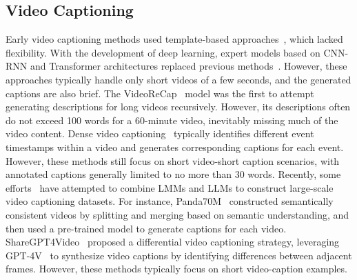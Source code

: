\subsection{Video Captioning}
Early video captioning methods used template-based approaches~\cite{kojima2002natural,guadarrama2013youtube2text,krishnamoorthy2013generating}, which lacked flexibility. 
With the development of deep learning, expert models based on CNN-RNN and Transformer architectures replaced previous methods~\cite{gao2020fused,hu2019hierarchical}. However, these approaches typically handle only short videos of a few seconds, and the generated captions are also brief. 
The VideoReCap~\cite{islam2024video} model was the first to attempt generating descriptions for long videos recursively. 
However, its descriptions often do not exceed 100 words for a 60-minute video, inevitably missing much of the video content. 
Dense video captioning~\cite{YangNSMPLSS23,KimKMC024,WangZLZC021} typically identifies different event timestamps within a video and generates corresponding captions for each event. 
However, these methods still focus on short video-short caption scenarios, with annotated captions generally limited to no more than 30 words. 
Recently, some efforts~\cite{chen2024panda,chen2024sharegpt4video} have attempted to combine LMMs and LLMs to construct large-scale video captioning datasets. 
For instance, Panda70M~\cite{chen2024panda} constructed semantically consistent videos by splitting and merging based on semantic understanding, and then used a pre-trained model to generate captions for each video. 
ShareGPT4Video~\cite{chen2024sharegpt4video} proposed a differential video captioning strategy, leveraging GPT-4V~\cite{achiam2023gpt} to synthesize video captions by identifying differences between adjacent frames. 
However, these methods typically focus on short video-caption examples.